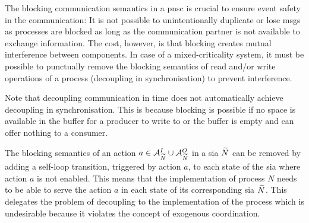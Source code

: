 The blocking communication semantics in a \gls{pnsc} is crucial to ensure event safety in the communication: It is not possible to unintentionally duplicate or lose \glspl*{msg} as processes are blocked as long as the communication partner is not available to exchange information.
The cost, however, is that blocking creates mutual interference between components.
In case of a mixed-criticality system, it must be possible to punctually remove the blocking semantics of read and/or write operations of a process (decoupling in synchronisation) to prevent interference.

Note that decoupling communication in time does not automatically achieve decoupling in synchronisation.
This is because blocking is possible if no space is available in the buffer for a producer to write to or the buffer is empty and can offer nothing to a consumer.

The blocking semantics of an action $a \in \mathcal{A}_{\widetilde{N}}^I \cup \mathcal{A}_{\widetilde{N}}^O$ in a \gls{sia} $\widetilde{N}$ can be removed by adding a self-loop transition, triggered by action $a$, to each state of the \gls{sia} where action $a$ is not enabled.
This means that the implementation of process $N$ needs to be able to serve the action $a$ in each state of its corresponding \gls{sia} $\widetilde{N}$.
This delegates the problem of decoupling to the implementation of the process which is undesirable because it violates the concept of exogenous coordination.

